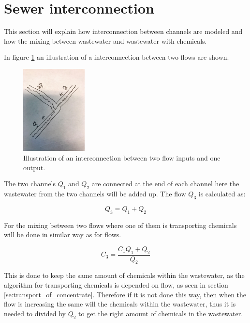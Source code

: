 \section{Sewer interconnection}\label{se:sewer_interconnection}
This section will explain how interconnection between channels are modeled and how the mixing between wastewater and wastewater with chemicals.

In figure \ref{fig:interconnections} an illustration of a interconnection between two flows are shown.

\begin{figure}[H]
\centering
\includegraphics[width=0.30\textwidth]{report/modeling/pictures/interconnections.jpg}
\caption{Illustration of an interconnection between two flow inputs and one output.}
\label{fig:interconnections}
\end{figure} 

The two channels $Q_1$ and $Q_2$ are connected at the end of each channel here the wastewater from the two channels will be added up. The flow $Q_3$ is calculated as:

\begin{equation}
	Q_3 = Q_1 + Q_2 	
\end{equation} 

For the mixing between two flows where one of them is transporting chemicals will be done in similar way as for flows. 

\begin{equation}
	C_3 = \frac{C_1 Q_1 + Q_2}{Q_2}
\end{equation}

This is done to keep the same amount of chemicals within the wastewater, as the algorithm for transporting chemicals is depended on flow, as seen in section \ref{se:transport_of_concentrate}. Therefore if it is not done this way, then when the flow is increasing the same will the chemicals within the wastewater, thus it is needed to divided by $Q_2$ to get the right amount of chemicals in the wastewater.  